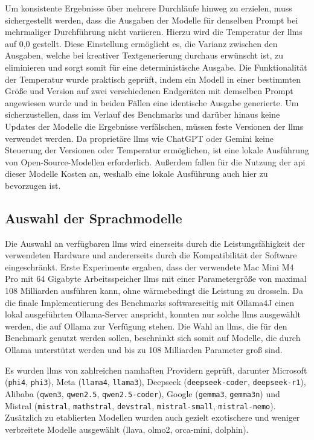 Um konsistente Ergebnisse über mehrere Durchläufe hinweg zu erzielen, muss sichergestellt werden, dass die Ausgaben der Modelle für denselben Prompt bei mehrmaliger Durchführung nicht variieren.
Hierzu wird die Temperatur der \glspl{llm} auf 0,0 gestellt.
Diese Einstellung ermöglicht es, die Varianz zwischen den Ausgaben, welche bei kreativer Textgenerierung durchaus erwünscht ist, zu eliminieren und sorgt somit für eine deterministische Ausgabe.
Die Funktionalität der Temperatur wurde praktisch geprüft, indem ein Modell in einer bestimmten Größe und Version auf zwei verschiedenen Endgeräten mit demselben Prompt angewiesen wurde und in beiden Fällen eine identische Ausgabe generierte.
Um sicherzustellen, dass im Verlauf des Benchmarks und darüber hinaus keine Updates der Modelle die Ergebnisse verfälschen, müssen feste Versionen der \glspl{llm} verwendet werden.
Da proprietäre \glspl{llm} wie ChatGPT oder Gemini keine Steuerung der Versionen oder Temperatur ermöglichen, ist eine lokale Ausführung von Open-Source-Modellen erforderlich.
Außerdem fallen für die Nutzung der \gls{api} dieser Modelle Kosten an, weshalb eine lokale Ausführung auch hier zu bevorzugen ist.


\subsection{Auswahl der Sprachmodelle}\label{sec:modelle-benchmark}

Die Auswahl an verfügbaren \glspl{llm} wird einerseits durch die Leistungsfähigkeit der verwendeten Hardware und andererseits durch die Kompatibilität der Software eingeschränkt.
Erste Experimente ergaben, dass der verwendete Mac Mini M4 Pro mit 64 Gigabyte Arbeitsspeicher \glspl{llm} mit einer Parametergröße von maximal 108 Milliarden ausführen kann, ohne wärmebedingt die Leistung zu drosseln.
Da die finale Implementierung des Benchmarks softwareseitig mit Ollama4J einen lokal ausgeführten Ollama-Server anspricht, konnten nur solche \glspl{llm} ausgewählt werden, die auf Ollama zur Verfügung stehen.
Die Wahl an \glspl{llm}, die für den Benchmark genutzt werden sollen, beschränkt sich somit auf Modelle, die durch Ollama unterstützt werden und bis zu 108 Milliarden Parameter groß sind.

Es wurden \glspl{llm} von zahlreichen namhaften Providern geprüft, darunter Microsoft (\texttt{phi4}, \texttt{phi3}), Meta (\texttt{llama4}, \texttt{llama3}), Deepseek (\texttt{deepseek-coder}, \texttt{deepseek-r1}), Alibaba (\texttt{qwen3}, \texttt{qwen2.5}, \texttt{qwen2.5-coder}), Google (\texttt{gemma3}, \texttt{gemma3n}) und Mistral (\texttt{mistral}, \texttt{mathstral}, \texttt{devstral}, \texttt{mistral-small}, \texttt{mistral-nemo}).
Zusätzlich zu etablierten Modellen wurden auch gezielt exotischere und weniger verbreitete Modelle ausgewählt (llava, olmo2, orca-mini, dolphin).

